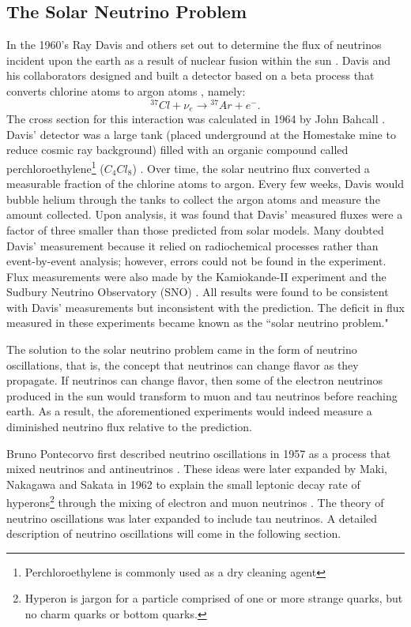 \subsection{The Solar Neutrino Problem}

In the 1960's Ray Davis and others set out to determine the flux of neutrinos
incident upon the earth as a result of nuclear fusion within the sun
\cite{davis}.  Davis
and his collaborators designed and built a detector based on a beta process
that converts chlorine atoms to argon atoms , namely:
\begin{equation}\label{nuChlorCap}
{}^{37}Cl + \nu_e  \rightarrow {}^{37}Ar + e^-.
\end{equation}
The cross section for this interaction was calculated in 1964 by John Bahcall
\cite{bahcall}.  Davis' detector was a large tank (placed underground at the
Homestake mine to reduce cosmic ray background) filled with an organic compound
called perchloroethylene\footnote{Perchloroethylene is commonly used as
a dry cleaning agent} ($C_4Cl_8$)  \cite{davis}.
Over time, the solar
neutrino flux converted a measurable fraction of the chlorine atoms to argon.
Every few weeks, Davis would bubble helium through the tanks to collect the
argon atoms and measure the amount collected.  Upon analysis, it was found that
Davis' measured fluxes were a factor of three smaller than those predicted from
solar models.  Many doubted Davis' measurement because it relied on
radiochemical processes rather than event-by-event analysis; however, errors
could not be found in the experiment.  Flux measurements were also made by the
Kamiokande-II experiment and the Sudbury Neutrino Observatory (SNO)
\cite{kamiokande, sno}.
All results were found to be consistent with Davis' measurements but
inconsistent with the prediction.  The deficit in flux measured in these
experiments became known as the ``solar neutrino problem."


The solution to the solar neutrino problem came in the form of neutrino
oscillations, that is, the concept that neutrinos can change flavor as they
propagate.  If neutrinos can change flavor, then some of the electron neutrinos
produced in the sun would transform to muon and tau neutrinos before reaching
earth.  As a result, the aforementioned experiments would indeed measure a
diminished neutrino flux relative to the prediction.

Bruno Pontecorvo first described neutrino oscillations in 1957 as a process
that mixed neutrinos and antineutrinos  \cite{pontecorvo}.  These ideas were
later expanded by Maki, Nakagawa and Sakata in 1962 to explain the small
leptonic decay rate of hyperons\footnote{Hyperon is jargon for a particle
comprised of
one or more strange quarks, but no charm quarks or bottom quarks.} through the
mixing of electron and muon neutrinos \cite{maki1962remarks}.  The theory of
neutrino oscillations was
later expanded to include tau neutrinos.  A detailed description of neutrino
oscillations will come in the following section.


